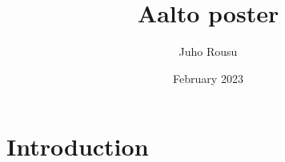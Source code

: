 \documentclass{article}
\title{Aalto poster}
\author{Juho Rousu}
\date{February 2023}
\begin{document}
\maketitle

\section{Introduction}
\end{document}
